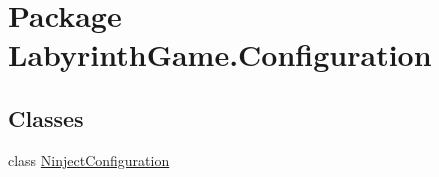 \hypertarget{namespace_labyrinth_game_1_1_configuration}{\section{Package Labyrinth\+Game.\+Configuration}
\label{namespace_labyrinth_game_1_1_configuration}
}
\subsection*{Classes}
\begin{DoxyCompactItemize}
\item 
class \hyperlink{class_labyrinth_game_1_1_configuration_1_1_ninject_configuration}{Ninject\+Configuration}
\end{DoxyCompactItemize}
